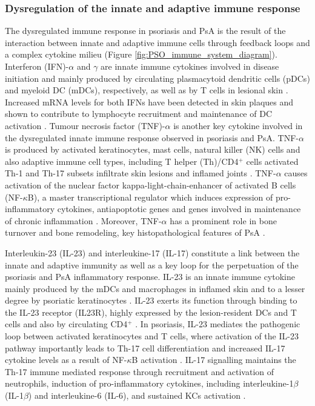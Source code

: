 \subsubsection*{Dysregulation of the innate and adaptive immune response}
The dysregulated immune response in psoriasis and PsA is the result of the interaction between innate and adaptive immune cells through feedback loops and a complex cytokine milieu (Figure \ref{fig:PSO_immune_system_diagram}). Interferon (IFN)-$\alpha$ and $\gamma$ are innate immune cytokines involved in disease initiation and mainly produced by circulating plasmacytoid dendritic cells (pDCs) and myeloid DC (mDCs), respectively, as well as by T cells in lesional skin \parencite{Leanne2009,Perera2012,Hijnen2013}. Increased mRNA levels for both IFNs have been detected in skin plaques and shown to contribute to lymphocyte recruitment and maintenance of DC activation \parencite{Schmid1994}. Tumour necrosis factor (TNF)-$\alpha$ is another key cytokine involved in the dysregulated innate immune response observed in psoriasis and PsA. TNF-$\alpha$ is produced by activated keratinocytes, mast cells, natural killer (NK) cells
 and also adaptive immune cell types, \textcolor[rgb]{1,0,0}{including T helper (Th)/CD4$^+$ cells activated Th-1 and Th-17 subsets infiltrate} skin lesions and inflamed joints \parencite{Perera2012,Lizzul2005}. TNF-$\alpha$ causes activation of the nuclear factor kappa-light-chain-enhancer of activated B cells (NF-$\kappa$B), a master transcriptional regulator which induces expression of pro-inflammatory cytokines, antiapoptotic genes and genes involved in maintenance of chronic inflammation \parencite{Lizzul2005, Johansen2004}. Moreover, TNF-$\alpha$ has a prominent role in bone turnover and bone remodeling, key histopathological features of PsA \parencite{Mensah2008}. 

Interleukin-23 (IL-23) and interleukine-17 (IL-17) constitute a link between the innate and adaptive immunity as well as a key loop for the perpetuation of the psoriasis and PsA inflammatory response. IL-23 is an innate immune cytokine mainly produced by the mDCs and macrophages in inflamed skin and to a lesser degree by psoriatic keratinocytes \parencite{Lee2004, Li2018}. IL-23 exerts its function through binding to the IL-23 receptor (IL23R), highly expressed by the lesion-resident DCs and T cells and also by circulating CD4$^+$ \parencite{Tonel2010}. In psoriasis, IL-23 mediates the pathogenic loop between activated keratinocytes and T cells, where activation of the IL-23 pathway importantly leads to Th-17 cell differentiation and increased IL-17 cytokine levels as a result of NF-$\kappa$B activation \parencite{McGeachy2009}. %
IL-17 signalling maintains the Th-17 immune mediated response through recruitment and activation of neutrophils, induction of pro-inflammatory cytokines, including interleukine-1$\beta$ (IL-1$\beta$) and interleukine-6 (IL-6), and sustained KCs activation \parencite{Doyle2012}.

